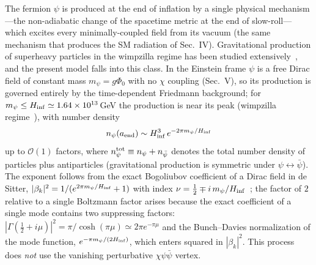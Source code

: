 \documentclass[pdflatex,sn-mathphys-num]{sn-jnl}
\newcommand{\PhiV}{\Phi_0}
\theoremstyle{thmstyleone}
\begin{document}
The fermion $\psi$ is produced at the end of inflation by a single physical mechanism---the non-adiabatic change of the spacetime metric at the end of slow-roll---which excites every minimally-coupled field from its vacuum (the same mechanism that produces the SM radiation of Sec.~IV). Gravitational production of superheavy particles in the wimpzilla regime has been studied extensively~\cite{ChungKolbRiotto1998,KolbChungRiotto1999,KuzminRubakov1998}, and the present model falls into this class. In the Einstein frame $\psi$ is a free Dirac field of constant mass $m_\psi=g\PhiV$ with no $\chi$ coupling (Sec.~V), so its production is governed entirely by the time-dependent Friedmann background; for $m_\psi\leq H_{\rm inf}\simeq1.64\times10^{13}\,$GeV the production is near its peak (wimpzilla regime~\cite{Ford1982,BirrellDavies}), with number density
\begin{equation}
n_\psi(a_{\rm end})\sim H_{\rm inf}^3\,e^{-2\pi m_\psi/H_{\rm inf}}
\label{eq:npsi}
\end{equation}
up to $\mathcal{O}(1)$ factors, where $n_\psi^{\rm tot}\equiv n_\psi+n_{\bar\psi}$ denotes the total number density of particles plus antiparticles (gravitational production is symmetric under $\psi\leftrightarrow\bar\psi$). The exponent follows from the exact Bogoliubov coefficient of a Dirac field in de Sitter, $|\beta_k|^2=1/(e^{2\pi m_\psi/H_{\rm inf}}+1)$ with index $\nu=\frac12\mp i\,m_\psi/H_{\rm inf}$~\cite{EmaNakayamaTang2019,Villalba1995}; the factor of $2$ relative to a single Boltzmann factor arises because the exact coefficient of a single mode contains two suppressing factors: $|\Gamma(\frac12+i\mu)|^2=\pi/\cosh(\pi\mu)\simeq2\pi e^{-\pi\mu}$ and the Bunch--Davies normalization of the mode function, $e^{-\pi m_\psi/(2H_{\rm inf})}$, which enters squared in $|\beta_k|^2$. This process does \emph{not} use the vanishing perturbative $\chi\psi\bar\psi$ vertex.
\end{document}
